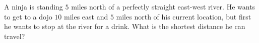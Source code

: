 A ninja is standing $5$ miles north of a perfectly straight east-west river. He wants to get to a dojo $10$ miles east and $5$ miles north of his current location, but first he wants to stop at the river for a drink. What is the shortest distance he can travel?
